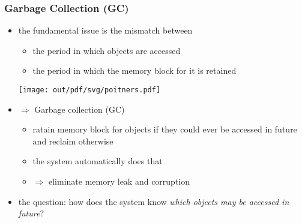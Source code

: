 \documentclass[12pt,dvipdfmx]{beamer}
\newcommand{\ao}[1]{{\color{blue}#1}}
\begin{document}
\begin{frame}
\frametitle{Garbage Collection (GC)}
\begin{itemize}
\item the fundamental issue is
  the mismatch between
  \begin{itemize}
  \item the period in which objects are accessed
  \item the period in which the memory block for it is retained
  \end{itemize}

  \begin{center}
    \texttt{[image: out/pdf/svg/poitners.pdf]}
  \end{center}

\item<2-> $\Rightarrow$ \ao{Garbage collection (GC)}
  \begin{itemize}
  \item \ao{ratain memory block for objects if they could ever be accessed in future
      and reclaim otherwise}
  \item the system automatically does that
  \item $\Rightarrow$ eliminate memory leak and corruption
  \end{itemize}
\item<3-> \ao{the question:} how does the system know
  \ao{\it which objects may be accessed in future}?
\end{itemize}
\end{frame}
\fi
\end{document}
